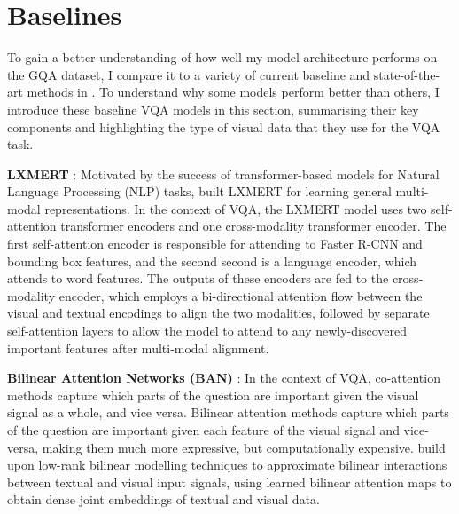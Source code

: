 \section{Baselines}

To gain a better understanding of how well my model architecture performs on the GQA dataset, I compare it to a variety of current baseline and state-of-the-art methods in \chapterautorefname{ \ref{chapter:results}}. To understand why some models perform better than others, I introduce these baseline VQA models in this section, summarising their key components and highlighting the type of visual data that they use for the VQA task.

\textbf{LXMERT} \cite{tan2019lxmert}: Motivated by the success of transformer-based models \cite{vaswani2017attention} for Natural Language Processing (NLP) tasks, \citeauthor{tan2019lxmert} built LXMERT for learning general multi-modal representations. In the context of VQA, the LXMERT model uses two self-attention transformer encoders and one cross-modality transformer encoder. The first self-attention encoder is responsible for attending to Faster R-CNN \cite{ren2016faster} and bounding box features, and the second second is a language encoder, which attends to word features. The outputs of these encoders are fed to the cross-modality encoder, which employs a bi-directional attention flow between the visual and textual encodings to align the two modalities, followed by separate self-attention layers to allow the model to attend to any newly-discovered important features after multi-modal alignment.

\textbf{Bilinear Attention Networks (BAN)} \cite{kim2018bilinear}: In the context of VQA, co-attention methods capture which parts of the question are important given the visual signal as a whole, and vice versa. Bilinear attention methods capture which parts of the question are important given each feature of the visual signal and vice-versa, making them much more expressive, but computationally expensive. \citeauthor{kim2018bilinear} build upon low-rank bilinear modelling techniques \cite{wolf2007modeling, pirsiavash2009bilinear} to approximate bilinear interactions between textual and visual input signals, using learned bilinear attention maps to obtain dense joint embeddings of textual and visual data.


